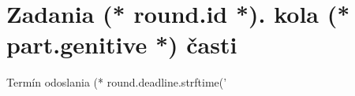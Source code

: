 \documentclass[12pt, twoside]{article}
\newcounter{problem}
\begin{document}
    \loadRegularStyle
    \thispagestyle{first}
    \vspace*{2em}

    {
        \section{\texorpdfstring{Zadania (* round.id *). kola (* part.genitive *) časti}{}}
        \centering
        \vspace{-1.3em}
        Termín odoslania (* round.deadline.strftime('%
    } 
        
    \pagestyle{problems}    
    \loadProblemsStyle
\end{document}
